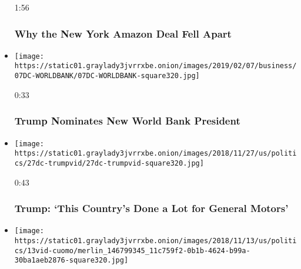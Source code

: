 \begin{itemize}
  1:56

  \hypertarget{why-the-new-york-amazon-deal-fell-apart}{%
  \subsubsection{Why the New York Amazon Deal Fell
  Apart}\label{why-the-new-york-amazon-deal-fell-apart}}
\item
  \href{https://www.nytimes3xbfgragh.onion/video/us/100000006345865/david-malpass-world-bank-trump.html?action=click\&module=video-series-bar\&region=header\&pgtype=Article\&playlistId=video/business}{}

  \texttt{[image: https://static01.graylady3jvrrxbe.onion/images/2019/02/07/business/07DC-WORLDBANK/07DC-WORLDBANK-square320.jpg]}

  0:33

  \hypertarget{trump-nominates-new-world-bank-president}{%
  \subsubsection{Trump Nominates New World Bank
  President}\label{trump-nominates-new-world-bank-president}}
\item
  \href{https://www.nytimes3xbfgragh.onion/video/us/100000006233336/trump-this-countrys-done-a-lot-for-general-motors.html?action=click\&module=video-series-bar\&region=header\&pgtype=Article\&playlistId=video/business}{}

  \texttt{[image: https://static01.graylady3jvrrxbe.onion/images/2018/11/27/us/politics/27dc-trumpvid/27dc-trumpvid-square320.jpg]}

  0:43

  \hypertarget{trump-this-countrys-done-a-lot-for-general-motors}{%
  \subsubsection{Trump: `This Country's Done a Lot for General
  Motors'}\label{trump-this-countrys-done-a-lot-for-general-motors}}
\item
  \href{https://www.nytimes3xbfgragh.onion/video/nyregion/100000006213884/amazon-new-york-cuomo-deblasio.html?action=click\&module=video-series-bar\&region=header\&pgtype=Article\&playlistId=video/business}{}

  \texttt{[image: https://static01.graylady3jvrrxbe.onion/images/2018/11/13/us/politics/13vid-cuomo/merlin\_146799345\_11c759f2-0b1b-4624-b99a-30ba1aeb2876-square320.jpg]}


\end{itemize}
